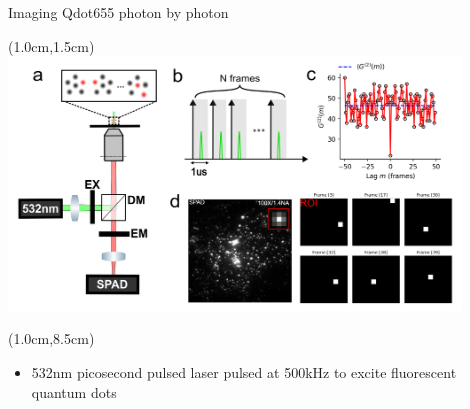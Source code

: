 \documentclass{beamer}					%
\begin{document}


\begin{frame}{Imaging Qdot655 photon by photon}
\begin{textblock*}{12cm}(1.0cm,1.5cm)
\includegraphics[width=12cm]{../../spad/spad/media/Figure-0.png}
\end{textblock*}
\begin{textblock*}{13cm}(1.0cm,8.5cm)
\begin{itemize}
\item 532nm picosecond pulsed laser pulsed at 500kHz to excite fluorescent quantum dots
\end{itemize}
\end{textblock*}

\end{frame}
\end{document}
